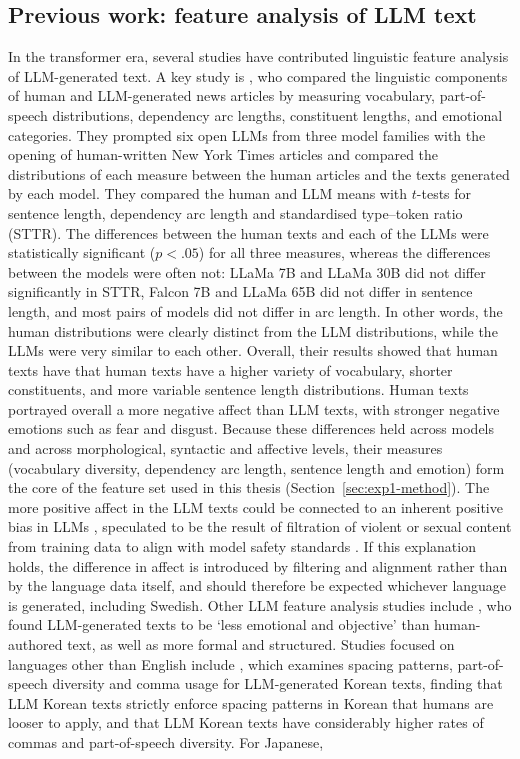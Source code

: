 \documentclass[thesis]{cluu}
\begin{document}
\subsection{Previous work: feature analysis of LLM text}
 In the transformer era, several studies have contributed linguistic feature analysis of LLM-generated text. A key study is \textcite{munoz-ortiz2024contrasting}, who compared the linguistic components of
human and LLM-generated news articles by measuring vocabulary, part-of-speech distributions, dependency arc lengths, constituent lengths, and emotional categories. They prompted six open LLMs from three model families with the opening of human-written New York Times articles and compared the distributions of each measure between the human articles and the texts generated by each model.
They compared the human and LLM means with $t$-tests for sentence length, dependency arc length and standardised type--token ratio (STTR). The differences between the human texts and each of the LLMs were statistically significant ($p < .05$) for all three measures, whereas the differences between the models were often not: LLaMa 7B and LLaMa 30B did not differ significantly in STTR, Falcon 7B and LLaMa 65B did not differ in sentence length, and most pairs of models did not differ in arc length. In other words, the human distributions were clearly distinct from the LLM distributions, while the LLMs were very similar to each other. Overall, their results showed that human texts have that human texts have a higher variety of vocabulary, shorter constituents, and more variable sentence length distributions. Human texts portrayed overall a more negative affect than LLM texts, with stronger negative emotions such as fear and disgust. Because these differences held across models and across morphological, syntactic and affective levels, their measures (vocabulary diversity, dependency arc length, sentence length and emotion) form the core of the feature set used in this thesis (Section~\ref{sec:exp1-method}). The more positive affect in the LLM texts could be connected to an inherent positive bias in LLMs \parencite{wu2025survey, giorgi2021characterizing, markowitz2024linguistic}, speculated to be the result of filtration of violent or sexual content from training data \parencite{liao2023differentiating} to align with model safety standards \parencite{ouyang2022training}. If this explanation holds, the difference in affect is introduced by filtering and alignment rather than by the language data itself, and should therefore be expected whichever language is generated, including Swedish. Other LLM feature analysis studies include \textcite{tang2023sciencedetectingllmgeneratedtexts}, who found LLM-generated texts to be `less emotional and objective' than human-authored text, as well as more formal and structured. Studies focused on languages other than English include \textcite{park2025katfishnet}, which examines spacing patterns, part-of-speech diversity and comma usage for LLM-generated Korean texts, finding that LLM Korean texts strictly enforce spacing patterns in Korean that humans are looser to apply, and that LLM Korean texts have considerably higher rates of commas and part-of-speech diversity. For Japanese, 
\end{document}
